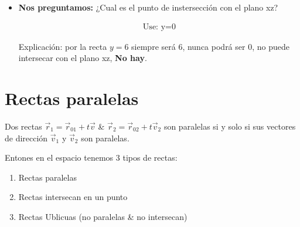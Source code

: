 \begin{itemize}
    \item \textbf{Nos preguntamos:} ¿Cual es el punto de instersección con el plano xz?
    \begin{center}
        \begin{align*}
            \text{  Use: y=0  }
        \end{align*}
    \end{center}
    Explicación: por la recta $y=6$ siempre será 6, nunca podrá ser $0$, no puede intersecar con el plano xz, \textbf{No hay}.
\end{itemize}



\section{Rectas paralelas}
Dos rectas $\vec{r}_1 = \vec{r}_{01} + t \vec{v}$ \& $\vec{r}_{2} = \vec{r}_{02} + t \vec{v}_2 $ son paralelas si y solo si sus vectores de dirección $\vec{v}_1$ y $\vec{v}_2 $ son paralelas.
\begin{figure}[htbp]
    \centering
    \caption{}
    \label{}
\end{figure} 

Entones en el espacio tenemos 3 tipos de rectas:
\begin{enumerate}
    \item Rectas paralelas  
    \item Rectas intersecan en un punto
    \item Rectas Ublicuas (no paralelas \& no intersecan)
\end{enumerate}

